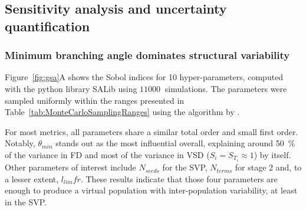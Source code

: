 \documentclass[11pt,]{article}
\begin{document}
\subsection{Sensitivity analysis and uncertainty quantification}\label{sec:gsaUQ}

\subsubsection{Minimum branching angle dominates structural variability}\label{sec:gsa}

Figure~\ref{fig:gsa}A shows the Sobol indices for \SI{10}{} hyper-parameters, computed with the python library SALib\cite{Iwanaga_2022,Herman_2017} using $\SI{11000}{}$ simulations.
The parameters were sampled uniformly within the ranges presented in Table~\ref{tab:MonteCarloSamplingRanges} using the algorithm by \citet{Saltelli2002}.

For most metrics, all parameters share a similar total order and small first order.
Notably, $\theta_{min}$ stands out as the most influential overall, explaining around \SI{50}{\percent} of the variance in FD and most of the variance in VSD ($S_i=S_{T_i}\approx 1$) by itself.
Other parameters of interest include $N_{seeds}$ for the SVP, $N_{terms}$ for stage 2 and, to a lesser extent, $l_{lim}fr$.
These results indicate that those four parameters are enough to produce a virtual population with inter-population variability, at least in the SVP.

\begin{table}[ht!]
  \centering
  \caption{\label{tab:MonteCarloSamplingRanges}Ranges for the hyper-parameters for the computation of Sobol indices.}
\end{table}
\end{document}
